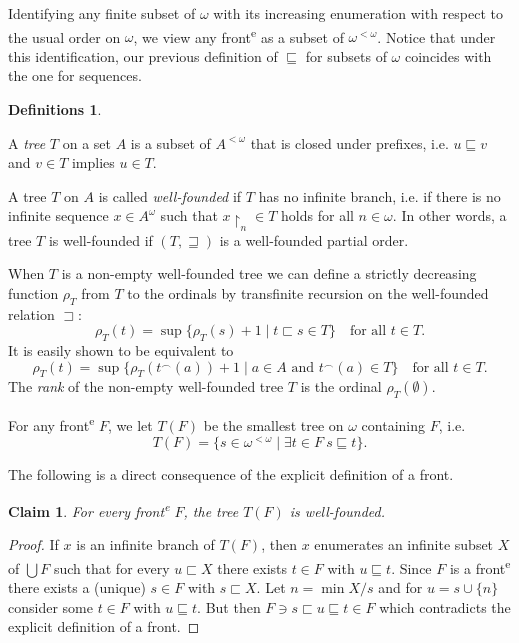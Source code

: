 \documentclass{article}%
\theoremstyle{plain}
\newtheorem{lemma}[theorem]{Properties}
\newtheorem{lemma}[theorem]{Lemma}
\newtheorem{lemma}[theorem]{Fact}
\newtheorem{lemma}[theorem]{Facts}
\newtheorem{lemma}{Claim}
\theoremstyle{definition}
\newtheorem{definition}[theorem]{Definition}
\newtheorem{definition}[theorem]{Notation}
\newtheorem{definition}[theorem]{Notations}
\newtheorem{definition}[theorem]{Definitions}
\theoremstyle{remark}
\newcommand{\ts}[1]{\textsuperscript{#1}}
\newcommand{\front}{front\ts{e}}
\newcommand{\conc}{\mathrel{{}^{\smallfrown}}} %
\newcommand{\restr}[1]{\mathord{\upharpoonright_{#1}}} %
\DeclareMathOperator{\base}{\mathord{\bigcup}}
\newcommand{\segm} {\sqsubseteq}
\newcommand{\mges} {\sqsupseteq}
\newcommand{\segs} {\sqsubset}
\newcommand{\sges} {\sqsupset}
\begin{document}
Identifying any finite subset of $\omega$ with its increasing enumeration with respect to the usual order on $\omega$, we view any \front{} as a subset of $\omega^{<\omega}$. 
Notice that under this identification, our previous definition of $\segm$ for subsets of $\omega$ coincides with the one for sequences. 

\begin{definition}\label{def trees}
\begin{enumDefn}
\item A \emph{tree} $T$ on a set $A$ is a subset of $A^{<\omega}$ that is closed under prefixes, i.e. $u\segm v$ and $v\in T$ implies $u\in T$. 
\item A tree $T$ on $A$ is called \emph{well-founded} if $T$ has no infinite branch, i.e. if there is no infinite sequence $x\in A^{\omega}$ such that $x\restr{n}\in T$ holds for all $n\in\omega$. In other words, a tree $T$ is well-founded if $(T,\mges)$ is a well-founded partial order.

\item When $T$ is a non-empty well-founded tree we can define a strictly decreasing function $\rho_{T}$ from $T$ to the ordinals by transfinite recursion on the well-founded relation $\sges$:
\[
\rho_{T}(t)=\sup\{\rho_{T}(s)+1 \mid t\segs s\in T\} \quad\text{for all $t\in T$.}
\] 
It is easily shown to be equivalent to
\[
\rho_{T}(t)=\sup\{\rho_{T}(t\conc (a))+1\mid a\in A \text{ and } t\conc(a)\in T\} \quad\text{for all $t\in T$.}
\]
The \emph{rank} of the non-empty well-founded tree $T$ is the ordinal $\rho_{T}(\emptyset)$. 
\end{enumDefn}
\end{definition}

For any \front{} $F$, we let $T(F)$ be the smallest tree on $\omega$ containing $F$, i.e.
\[
T(F)=\{s\in\omega^{<\omega}\mid \exists t\in F \ s\segm t\}.
\]

The following is a direct consequence of the explicit definition of a front.
\begin{lemma}\label{lem TreeFrontWellFounded}
For every \front{} $F$, the tree $T(F)$ is well-founded.
\end{lemma}
\begin{proof}
If $x$ is an infinite branch of $T(F)$, then $x$ enumerates an infinite subset $X$ of $\base F$ such that for every $u\segs X$ there exists $t\in F$ with $u\segm t$. Since $F$ is a \front{} there exists a (unique) $s\in F$ with $s\segs X$. Let $n=\min X/ s$ and for $u=s\cup \{n\}$ consider some $t\in F$ with $u\segm t$.
But then $F\ni s\segs u\segm t\in F$ which contradicts the explicit definition of a front. 
\end{proof}
\end{document}

